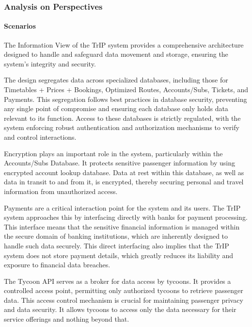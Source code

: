 \subsubsection{Analysis on Perspectives}


\paragraph{Scenarios}


The Information View of the TrIP system provides a comprehensive architecture designed to handle and safeguard data movement and storage, ensuring the system's integrity and security.

The design segregates data across specialized databases, including those for Timetables + Prices + Bookings, Optimized Routes, Accounts/Subs, Tickets, and Payments. This segregation follows best practices in database security, preventing any single point of compromise and ensuring each database only holds data relevant to its function. Access to these databases is strictly regulated, with the system enforcing robust authentication and authorization mechanisms to verify and control interactions.

Encryption plays an important role in the system, particularly within the Accounts/Subs Database. It protects sensitive passenger information by using encrypted account lookup database. Data at rest within this database, as well as data in transit to and from it, is encrypted, thereby securing personal and travel information from unauthorized access.

Payments are a critical interaction point for the system and its users. The TrIP system approaches this by interfacing directly with banks for payment processing. This interface means that the sensitive financial information is managed within the secure domain of banking institutions, which are inherently designed to handle such data securely. This direct interfacing also implies that the TrIP system does not store payment details, which greatly reduces its liability and exposure to financial data breaches.

The Tycoon API serves as a broker for data access by tycoons. It provides a controlled access point, permitting only authorized tycoons to retrieve passenger data. This access control mechanism is crucial for maintaining passenger privacy and data security. It allows tycoons to access only the data necessary for their service offerings and nothing beyond that.

